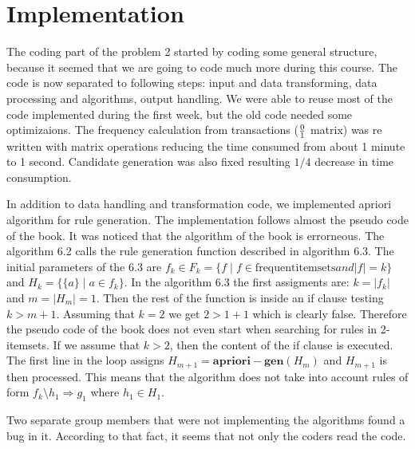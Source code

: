 \section{Implementation}
The coding part of the problem 2 started by coding some general structure, because 
it seemed that we are going to code much more during this course. The code is now
separated to following steps: input and data transforming, data processing and algorithms, output handling.
We were able to reuse most of the code implemented during the first week, but the old
code needed some optimizaions. The frequency calculation from transactions ($0 \over 1$ matrix) was re written with matrix operations
reducing the time consumed from about 1 minute to 1 second. Candidate generation was
also fixed resulting $1/4$ decrease in time consumption.

In addition to data handling and transformation code, we implemented apriori algorithm 
for rule generation. The implementation follows almost the pseudo code of the book. 
It was noticed that the algorithm of the book is errorneous. 
The algorithm 6.2 calls the rule generation function described in algorithm 6.3.
The initial parameters of the 6.3 are $f_k \in F_k = \{f \mid f \in \mathrm{frequent itemsets} and |f|=k \}$ 
and $H_k = \{\{a\} \mid a \in f_k \}$. In the algorithm 6.3 the first assigments are:
$k = |f_k|$ and $m = |H_m| = 1$. Then the rest of the function is inside an if clause
testing $k > m + 1$. Assuming that $k=2$ we get $2 > 1+1$ which is clearly false. 
Therefore the pseudo code of the book does not even start when searching for rules in 2-itemsets.
If we assume that $k>2$, then the content of the if clause is executed. The first 
line in the loop assigns $H_{m+1} = \mathbf{apriori-gen}(H_m)$ and $H_{m+1}$ is then processed.
This means that the algorithm does not take into account rules of form $f_k \setminus h_1 \Rightarrow g_1$ where $h_1 \in H_1$.

Two separate group members that were not implementing the algorithms found a bug in it. 
According to that fact, it seems that not only the coders read the code.
